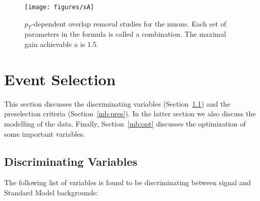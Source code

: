 \begin{figure}[H]
	\texttt{[image: figures/sA]}
	\centering

	\caption{$p_T$-dependent overlap removal studies for the muons. Each set of
		parameters in the formula is called a combination. The maximal gain
		achievable a is $1.5$.}

	\label{f:sa}
\end{figure}



\section{Event Selection}\label{mbselection}

This section discusses the discriminating variables (Section~\ref{mb:disv}) and
the preselection criteria (Section~\ref{mb:pres}). In the latter section we
also discuss the modelling of the data. Finally, Section~\ref{mb:opt} discusses
the optimization of some important variables.

\subsection{Discriminating Variables}\label{mb:disv}

The following list of variables is found to be discriminating between signal
and Standard Model backgrounds:

